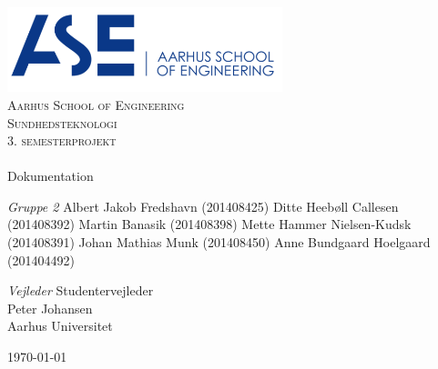 \begin{titlingpage}
\begin{center}

~ \\[3cm]

\includegraphics[width=0.6\textwidth]{figurer/ASE}~\\[1cm]

\textsc{\LARGE Aarhus School of Engineering}\\[1.5cm]

\textsc{\Large Sundhedsteknologi}\\
\textsc{\Large 3. semesterprojekt}\\[0.5cm]

\noindent\makebox[\linewidth]{\rule{\textwidth}{0.4pt}}\\
[0.5cm]{\Huge Dokumentation}
\noindent\makebox[\linewidth]{\rule{\textwidth}{0.4pt}}

\end{center}

\textit{Gruppe 2} \newline
Albert Jakob Fredshavn (201408425) \newline
Ditte Heebøll Callesen (201408392) \newline
Martin Banasik  (201408398) \newline
Mette Hammer Nielsen-Kudsk  (201408391) \newline		 
Johan Mathias Munk  (201408450) \newline 
Anne Bundgaard Hoelgaard  (201404492) \newline


\textit{Vejleder} \newline
Studentervejleder\\
Peter Johansen\\
Aarhus Universitet


\vfill

\begin{center}
{\large \today}
\end{center}


\end{titlingpage}